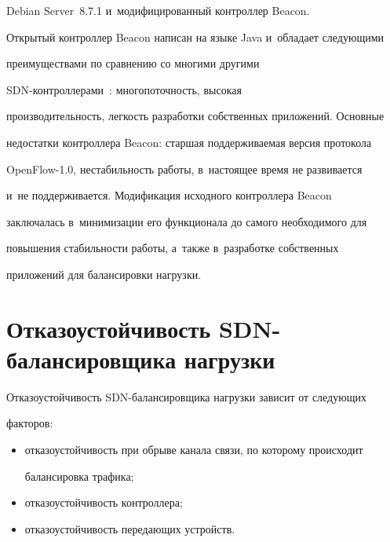 Debian Server~8.7.1 и~модифицированный контроллер Beacon.


  


  Открытый контроллер Beacon написан на языке Java и~обладает следующими 


преимуществами по сравнению со многими другими  


SDN-конт\-рол\-ле\-ра\-ми~\cite{7-sdn, 8-sdn}: многопоточность, высокая 


производительность, легкость разработки собственных приложений. Основные 


недостатки контроллера Beacon: старшая поддерживаемая версия протокола 


OpenFlow-1.0, нестабильность работы, в~настоящее время не развивается 


и~не поддерживается. Модификация исходного контроллера Beacon 


заключалась в~минимизации его функционала до самого необходимого для 


повышения стабильности работы, а~также в~разработке собственных 


приложений для балансировки нагрузки.





\vspace*{-4pt}


  


\section{Отказоустойчивость SDN-балансировщика нагрузки}





\vspace*{-2pt}





  Отказоустойчивость SDN-балансировщика нагрузки зависит от следующих 


факторов:


  \begin{itemize}


\item отказоустойчивость при обрыве канала связи, по которому происходит 


балансировка трафика;\\[-14pt]


\item отказоустойчивость контроллера;\\[-14pt]


\item отказоустойчивость передающих устройств.


\end{itemize}





